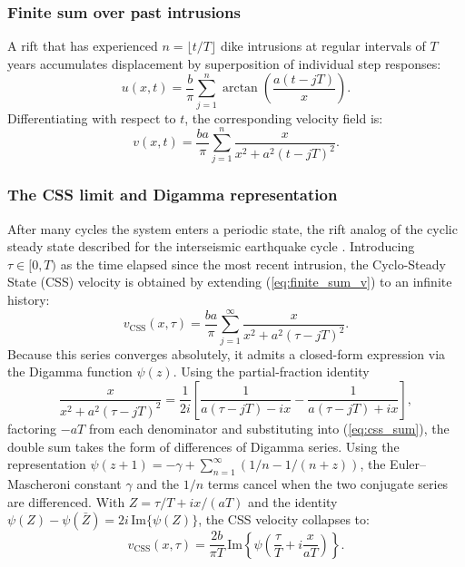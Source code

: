 \documentclass[extra]{gji}
\newcommand{\IM}{\mathrm{Im}}
\begin{document}
\subsubsection{Finite sum over past intrusions}

A rift that has experienced $n = \lfloor t/T \rfloor$ dike intrusions at
regular intervals of $T$ years accumulates displacement by superposition of
individual step responses:
\begin{equation}
u(x,t) = \frac{b}{\pi}\sum_{j=1}^{n}
  \arctan\!\left(\frac{a(t-jT)}{x}\right).
\label{eq:finite_sum}
\end{equation}
Differentiating with respect to $t$, the corresponding velocity field is:
\begin{equation}
v(x,t) = \frac{b a}{\pi}\sum_{j=1}^{n}
  \frac{x}{x^2 + a^2(t-jT)^2}.
\label{eq:finite_sum_v}
\end{equation}

\subsubsection{The CSS limit and Digamma representation}

After many cycles the system enters a periodic state, the rift analog of the
cyclic steady state described for the interseismic earthquake cycle \citep{thatcher1984viscoelastic,hetland2006interseismic}. Introducing
$\tau\in[0,T)$ as the time elapsed since the most recent intrusion, the
Cyclo-Steady State (CSS) velocity is obtained by extending
(\ref{eq:finite_sum_v}) to an infinite history:
\begin{equation}
v_{\text{CSS}}(x,\tau) = \frac{b a}{\pi}
  \sum_{j=1}^{\infty}\frac{x}{x^2 + a^2(\tau-jT)^2}.
\label{eq:css_sum}
\end{equation}
Because this series converges absolutely, it admits a closed-form expression
via the Digamma function $\psi(z)$. Using the partial-fraction identity
\begin{equation*}
\frac{x}{x^2+a^2(\tau-jT)^2}
= \frac{1}{2i}\!\left[
    \frac{1}{a(\tau-jT)-ix} - \frac{1}{a(\tau-jT)+ix}
  \right],
\end{equation*}
factoring $-aT$ from each denominator and substituting into
(\ref{eq:css_sum}), the double sum takes the form of differences of Digamma
series. Using the representation $\psi(z+1) = -\gamma +
\sum_{n=1}^\infty(1/n - 1/(n+z))$, the Euler--Mascheroni constant $\gamma$ and
the $1/n$ terms cancel when the two conjugate series are differenced. With
$Z = \tau/T + ix/(aT)$ and the identity
$\psi(Z)-\psi(\bar{Z}) = 2i\,\IM\{\psi(Z)\}$,
the CSS velocity collapses to:
\begin{equation}
\boxed{v_{\text{CSS}}(x,\tau) =
  \frac{2b}{\pi T}\,\IM\!\left\{
    \psi\!\left(\frac{\tau}{T}+i\frac{x}{aT}\right)
  \right\}.}
\label{eq:vcss}
\end{equation}
\end{document}
